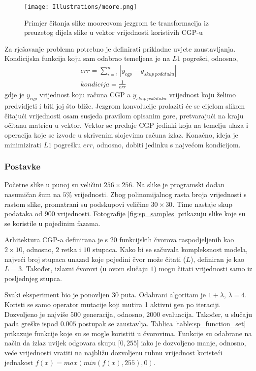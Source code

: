 \begin{figure}
	\centering
	\texttt{[image: Illustrations/moore.png]}
	\caption{Primjer čitanja slike mooreovom jezgrom te transformacija iz preuzetog dijela slike u vektor vrijednosti koristivih CGP-u}
	\label{fig:moore_example}
\end{figure}

Za rješavanje problema potrebno je definirati prikladne uvjete zaustavljanja.
Kondicijska funkcija koju sam odabrao temeljena je na $L1$ pogrešci, odnosno,
\begin{gather*}
err = \sum_{i=1}^{n} |y_{cgp} - y_{skup\ podataka}| \\
kondicija = \frac{1}{err}
\end{gather*}
gdje je $y_{cgp}$ vrijednost koju računa CGP a $y_{skup\ podataka}$ vrijednost koju želimo predvidjeti i biti joj što bliže.
Jezgrom konvolucije prolaziti će se cijelom slikom čitajući vrijednosti osam susjeda pravilom opisanim gore, pretvarajući na kraju očitanu matricu u vektor.
Vektor se predaje CGP jedinki koja na temelju ulaza i operacija koje se izvode u skrivenim slojevima računa izlaz.
Konačno, ideja je minimizirati $L1$ pogrešku $err$, odnosno, dobiti jedinku s najvećom kondicijom.

\subsubsection{Postavke}
Početne slike u punoj su veličini $256 \times 256$.
Na slike je programski dodan nasumičan šum na $5\%$ vrijednosti.
Zbog polinomijalnog rasta broja vrijednosti s rastom slike, promatrani su podskupovi veličine $30 \times 30$.
Time nastaje skup podataka od $900$ vrijednosti.
Fotografije \ref{fig:sp_samples} prikazuju slike koje su se koristile u pojedinim fazama.

Arhitektura CGP-a definirana je s $20$ funkcijskih čvorova raspodjeljenih kao $2 \times 10$, odnosno, $2$ retka i $10$ stupaca.
Kako bi se sačuvala kompleksnost modela, najveći broj stupaca unazad koje pojedini čvor može čitati ($L$), definiran je kao $L = 3$.
Također, izlazni čvorovi (u ovom slučaju $1$) mogu čitati vrijednosti samo iz posljednjeg stupca.

Svaki eksperiment bio je ponovljen 30 puta.
Odabrani algoritam je $1 + \lambda$, $\lambda = 4$.
Koristi se samo operator mutacije koji mutira 1 aktivni gen po iteraciji.
Dozvoljeno je najviše $500$ generacija, odnosno, $2000$ evaluacija.
Također, u slučaju pada greške ispod $0.005$ postupak se zaustavlja.
Tablica \ref{table:sp_function_set} prikazuje funkcije koje su se mogle koristiti u čvorovima.
Funkcije su odabrane na način da izlaz uvijek odgovara skupu $[0, 255$] iako je dozvoljeno manje, odnosno, veće vrijednosti vratiti na najbližu dozvoljenu rubnu vrijednost koristeći jednakost $f(x) = max(min(f(x), 255), 0)$.

